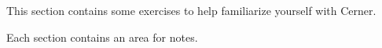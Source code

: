 This section contains some exercises to help familiarize yourself with Cerner.

Each section contains an area for notes.